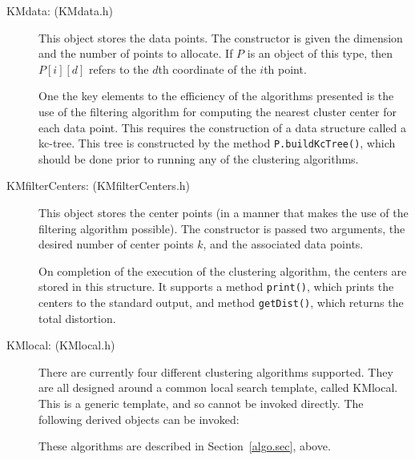 \documentclass[11pt]{article}		%
\newenvironment{description*}%
  {\begin{description}%
    \setlength{\itemsep}{-0.5ex}%
    \setlength{\parsep}{0pt}}%
  {\end{description}}
\begin{document}
\begin{description}
\item[KMdata: (KMdata.h)] This object stores the data points.  The
	constructor is given the dimension and the number of points to
	allocate.  If $P$ is an object of this type, then $P[i][d]$
	refers to the $d$th coordinate of the $i$th point.

	One the key elements to the efficiency of the algorithms
	presented is the use of the filtering algorithm for computing
	the nearest cluster center for each data point.  This requires
	the construction of a data structure called a kc-tree.  This tree
	is constructed by the method \texttt{P.buildKcTree()}, which
	should be done prior to running any of the clustering
	algorithms.
\item[KMfilterCenters: (KMfilterCenters.h)] This object stores the
	center points (in a manner that makes the use of the filtering
	algorithm possible).  The constructor is passed two arguments,
	the desired number of center points $k$, and the associated
	data points.
	
	On completion of the execution of the clustering algorithm,
	the centers are stored in this structure.  It supports a
	method \texttt{print()}, which prints the centers to
	the standard output, and method \texttt{getDist()}, which
	returns the total distortion.

\item[KMlocal: (KMlocal.h)] There are currently four different
	clustering algorithms supported.  They are all designed around a
	common local search template, called KMlocal.  This is a generic
	template, and so cannot be invoked directly.  The following
	derived objects can be invoked:
	These algorithms are described in Section~\ref{algo.sec}, above.


\end{description}
\end{document}

